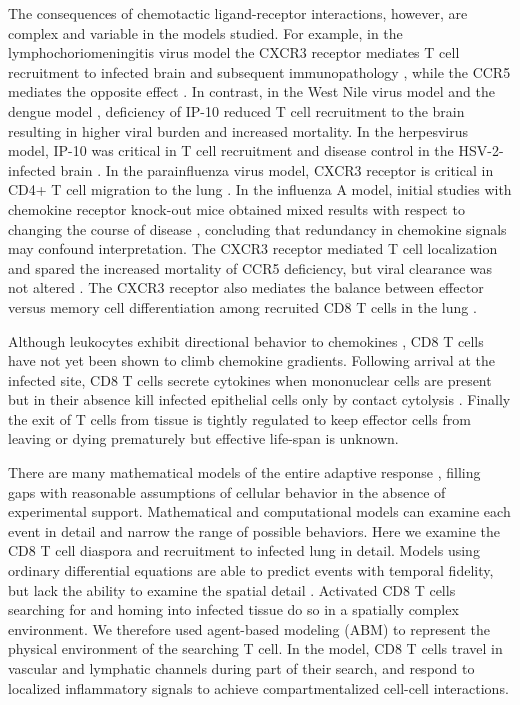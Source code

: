 \documentclass[10pt]{article}
\begin{document}
The consequences of chemotactic ligand-receptor interactions, however, are complex \cite{Groom2011a, Groom2011} and variable in the models studied.   For example, in the lymphochoriomeningitis virus model the CXCR3 receptor mediates T cell recruitment to infected brain and subsequent immunopathology \cite{Christensen2004, Christensen2006}, while the CCR5 mediates the opposite effect \cite{DeLemos2005}.  In contrast, in the West Nile virus model \cite{Klein2005} and the dengue model \cite{Hsieh2006}, deficiency of IP-10 reduced T cell recruitment to the brain resulting in higher viral burden and increased mortality.   In the herpesvirus model, IP-10 was critical in T cell recruitment and disease control in the HSV-2-infected brain \cite{Wuest2008, Thapa2008}.  In the parainfluenza virus model, CXCR3 receptor is critical in CD4+ T cell migration to the lung \cite{Kohlmeier2009}.  In the influenza A model, initial studies with chemokine receptor knock-out mice obtained mixed results with respect to changing the course of disease \cite{Dawson2000, Wareing2004}, concluding that redundancy in chemokine signals may confound interpretation.   The CXCR3 receptor mediated T cell localization and spared the increased mortality of CCR5 deficiency, but viral clearance was not altered \cite{Fadel2008}.  The CXCR3 receptor also mediates the balance between effector versus memory cell differentiation among recruited CD8 T cells in the lung \cite{Kohlmeier2011}.   

Although leukocytes exhibit directional behavior to chemokines \cite{LiJeon2002, McDonald2010}, CD8 T cells have not yet been shown to climb chemokine gradients.   Following arrival at the infected site, CD8 T cells secrete cytokines when mononuclear cells are present but in their absence kill infected epithelial cells only by contact cytolysis \cite{Hufford2011}.   Finally the exit of T cells from tissue is tightly regulated to keep effector cells from leaving or dying prematurely \cite{Jennrich2012, Richter2007} but effective life-span is unknown. 

There are many mathematical models of the entire adaptive response \cite{Miao2010, Saenz2010, Beltman2007, Handel2008, Zheng2008, Lee2009}, filling gaps with reasonable assumptions of cellular behavior in the absence of experimental support.  Mathematical and computational models can examine each event in detail and narrow the range of possible behaviors.  Here we examine the CD8 T cell diaspora and recruitment to infected lung in detail.  Models using ordinary differential equations are able to predict events with temporal fidelity, but lack the ability to examine the spatial detail \cite{Beauchemin2006a, Bauer2009}.   Activated CD8 T cells searching for and homing into infected tissue do so in a spatially complex environment.  We therefore used agent-based modeling (ABM) to represent the physical environment of the searching T cell.  In the model, CD8 T cells travel in vascular and lymphatic channels during part of their search, and respond to localized inflammatory signals to achieve compartmentalized cell-cell interactions.  
\end{document}
